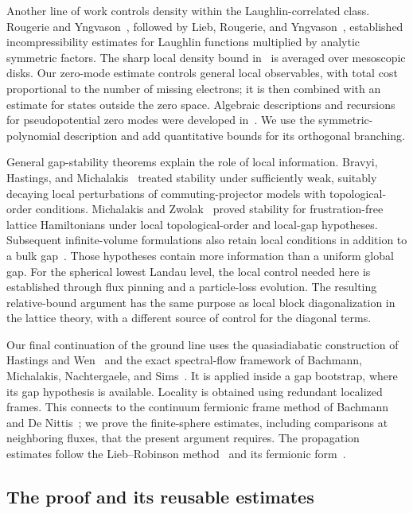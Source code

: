 Another line of work controls density within the Laughlin-correlated
class. Rougerie and Yngvason~\cite{RY}, followed by Lieb, Rougerie,
and Yngvason~\cite{LRY}, established incompressibility estimates for
Laughlin functions multiplied by analytic symmetric factors. The
sharp local density bound in~\cite{LRY} is averaged over mesoscopic
disks. Our zero-mode estimate controls general local observables,
with total cost proportional to the number of missing electrons;
it is then combined with an estimate for states outside the zero space.
Algebraic descriptions and recursions for pseudopotential zero modes
were developed in~\cite{CS,MONS}. We use the symmetric-polynomial
description and add quantitative bounds for its orthogonal branching.

General gap-stability theorems explain the role of local information.
Bravyi, Hastings, and Michalakis~\cite{BHM} treated stability under
sufficiently weak, suitably decaying local perturbations of
commuting-projector models with topological-order conditions. Michalakis and
Zwolak~\cite{MZ} proved stability for frustration-free lattice
Hamiltonians under local topological-order and local-gap hypotheses.
Subsequent infinite-volume formulations also retain local conditions
in addition to a bulk gap~\cite{NSYBulk}.
Those hypotheses contain more information than a uniform global gap.
For the spherical lowest Landau level, the local control needed here
is established through flux pinning and a particle-loss evolution.
The resulting relative-bound argument has the same purpose as local
block diagonalization in the lattice theory, with a different source
of control for the diagonal terms.

Our final continuation of the ground line uses the quasiadiabatic
construction of Hastings and Wen~\cite{HW} and the exact spectral-flow
framework of Bachmann, Michalakis, Nachtergaele, and Sims~\cite{BMNS}.
It is applied inside a gap bootstrap, where its gap hypothesis is
available. Locality is obtained using redundant localized frames.
This connects to the continuum fermionic frame method of Bachmann and
De Nittis~\cite{BDN}; we prove the finite-sphere estimates, including
comparisons at neighboring fluxes, that the present argument requires.
The propagation estimates follow the Lieb--Robinson method~\cite{LR}
and its fermionic form~\cite{NSY}.

\subsection{The proof and its reusable estimates}

